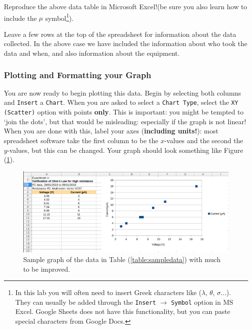 Reproduce the above data table in Microsoft Excel!(be sure you also learn how to include the $\mu$ symbol\footnote{In this lab you will often need to insert Greek characters like ($\lambda$, $\theta$, $\sigma\hdots$). They can usually be added through the \texttt{Insert} $\longrightarrow$ \texttt{Symbol} option in MS Excel. Google Sheets does not have this functionality, but you can paste special characters from Google Docs.}).

\begin{tip}
Leave a few rows at the top of the spreadsheet for information about the data collected. In the above case we have included the information about who took the data and when, and also information about the equipment.
\end{tip}

\subsubsection{Plotting and Formatting your Graph}

You are now ready to begin plotting this data. Begin by selecting both columns and \texttt{Insert} a \texttt{Chart}. When you are asked to select a \texttt{Chart Type}, select the \texttt{XY (Scatter)} option with points \textbf{only}. This is important: you might be tempted to `join the dots', but that would be misleading: especially if the graph is not linear! When you are done with this, label your axes (\textbf{including units!}): most spreadsheet software take the first column to be the $x$-values and the second the $y$-values, but this can be changed. Your graph should look something like Figure (\ref{fig:samplegraph1}). 

\begin{figure}[!htb]
    \centering
    \includegraphics[scale=0.75]{figs/samplegraph1.png}
    \caption{Sample graph of the data in Table (\ref{table:sampledata}) with much to be improved.}
    \label{fig:samplegraph1}
\end{figure}

